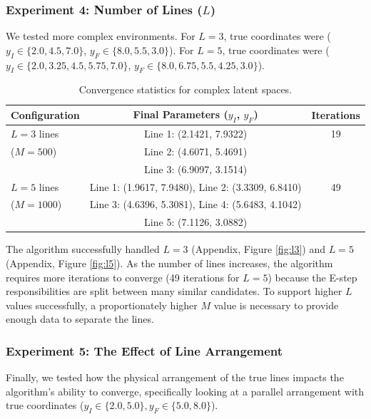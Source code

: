 \documentclass{article}
\begin{document}
\subsubsection{Experiment 4: Number of Lines ($L$)}
We tested more complex environments. For $L=3$, true coordinates were ($y_I \in \{2.0, 4.5, 7.0\}$, $y_F \in \{8.0, 5.5, 3.0\}$). For $L=5$, true coordinates were ($y_I \in \{2.0, 3.25, 4.5, 5.75, 7.0\}$, $y_F \in \{8.0, 6.75, 5.5, 4.25, 3.0\}$).

\begin{table}[H]
\centering
\begin{tabular}{|l|c|c|}
\hline
\textbf{Configuration} & \textbf{Final Parameters ($y_I$, $y_F$)} & \textbf{Iterations} \\ \hline
$L = 3$ lines & Line 1: (2.1421, 7.9322) & 19 \\ 
($M=500$) & Line 2: (4.6071, 5.4691) & \\ 
 & Line 3: (6.9097, 3.1514) & \\ \hline
$L = 5$ lines & Line 1: (1.9617, 7.9480), Line 2: (3.3309, 6.8410) & 49 \\ 
($M=1000$) & Line 3: (4.6396, 5.3081), Line 4: (5.6483, 4.1042) & \\ 
 & Line 5: (7.1126, 3.0882) & \\ \hline
\end{tabular}
\caption{Convergence statistics for complex latent spaces.}
\label{tab:lines}
\end{table}

The algorithm successfully handled $L=3$ (Appendix, Figure \ref{fig:l3}) and $L=5$ (Appendix, Figure \ref{fig:l5}). As the number of lines increases, the algorithm requires more iterations to converge (49 iterations for $L=5$) because the E-step responsibilities are split between many similar candidates. To support higher $L$ values successfully, a proportionately higher $M$ value is necessary to provide enough data to separate the lines.

\subsubsection{Experiment 5: The Effect of Line Arrangement}
Finally, we tested how the physical arrangement of the true lines impacts the algorithm's ability to converge, specifically looking at a parallel arrangement with true coordinates ($y_I \in \{2.0, 5.0\}, y_F \in \{5.0, 8.0\}$).
\end{document}
